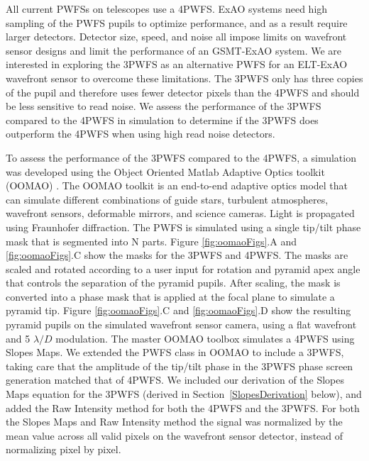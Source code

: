 All current PWFSs on telescopes use a 4PWFS. ExAO systems need high sampling of the PWFS pupils to optimize performance, and as a result require larger detectors. Detector size, speed, and noise all impose limits on wavefront sensor designs and limit the performance of an GSMT-ExAO system. We are interested in exploring the 3PWFS as an alternative PWFS for an ELT-ExAO wavefront sensor to overcome these limitations. The 3PWFS only has three copies of the pupil and therefore uses fewer detector pixels than the 4PWFS and should be less sensitive to read noise. We assess the performance of the 3PWFS compared to the 4PWFS in simulation to determine if the 3PWFS does outperform the 4PWFS when using high read noise detectors.

To assess the performance of the 3PWFS compared to the 4PWFS, a simulation was developed using the Object Oriented Matlab Adaptive Optics toolkit (OOMAO) \citep{OOMAO}. The OOMAO toolkit is an end-to-end adaptive optics model that can simulate different combinations of guide stars, turbulent atmospheres, wavefront sensors, deformable mirrors, and science cameras. Light is propagated using Fraunhofer diffraction. The PWFS is simulated using a single tip/tilt phase mask that is segmented into N parts. Figure \ref{fig:oomaoFigs}.A and \ref{fig:oomaoFigs}.C show the masks for the 3PWFS and 4PWFS. The masks are scaled and rotated according to a user input for rotation and pyramid apex angle that controls the separation of the pyramid pupils. After scaling, the mask is converted into a phase mask that is applied at the focal plane to simulate a pyramid tip. Figure \ref{fig:oomaoFigs}.C and \ref{fig:oomaoFigs}.D show the resulting pyramid pupils on the simulated wavefront sensor camera, using a flat wavefront and 5 $\lambda/D$ modulation. The master OOMAO toolbox simulates a 4PWFS using Slopes Maps. We extended the PWFS class in OOMAO to include a 3PWFS, taking care that the amplitude of the tip/tilt phase in the 3PWFS phase screen generation matched that of 4PWFS. We included our derivation of the Slopes Maps equation for the 3PWFS (derived in Section~\ref{SlopesDerivation} below), and added the Raw Intensity method for both the 4PWFS and the 3PWFS. For both the Slopes Maps and Raw Intensity method the signal was normalized by the mean value across all valid pixels on the wavefront sensor detector, instead of normalizing pixel by pixel. 


